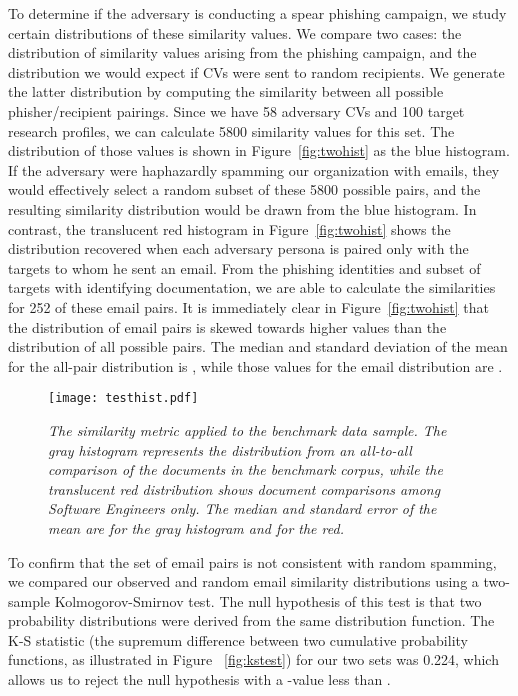 \documentclass[conference]{IEEEtran}
\begin{document}
To determine if the adversary is conducting a spear phishing campaign, we study certain distributions of these similarity values.  We compare two cases: the distribution of similarity values arising from the phishing 
campaign, and the distribution we would expect if CVs were sent to random recipients. We generate the latter distribution by computing the similarity between all possible phisher/recipient pairings. Since we have 58 adversary CVs and 100 target research profiles, we can calculate 5800 similarity values for this set.  The distribution of those values 
is shown in Figure~\ref{fig:twohist} as the blue histogram.  
If the adversary were haphazardly spamming our organization with emails, they would effectively select a random subset of these 5800 possible pairs, and the resulting similarity distribution would be drawn 
from the blue histogram.  In contrast, the translucent red histogram in 
Figure~\ref{fig:twohist} shows the distribution recovered when each adversary persona is paired only with the targets to whom he sent an email.  From 
the phishing identities and subset of targets with identifying documentation, we are able to calculate the similarities for 252 of these email pairs. It is immediately clear in Figure~\ref{fig:twohist} that the 
distribution of email pairs is skewed towards higher values than the distribution of all possible pairs.  The median and standard deviation of the mean for the all-pair distribution is , while those values for the email distribution are .

\begin{figure}[t!]
\begin{center}
\texttt{[image: testhist.pdf]}
\caption{\sl The similarity metric applied to the benchmark data sample.  The gray histogram represents the distribution from an all-to-all comparison of the documents in the 
benchmark corpus, while the translucent red 
distribution shows document comparisons among Software Engineers only.  The median and standard error of the mean are  for the gray histogram and  for the red. \label{fig:benchhist}}
\end{center}
\end{figure}

To confirm that the set of email pairs is not consistent with random spamming, we compared our observed and random email similarity distributions using a two-sample Kolmogorov-Smirnov test.  The null hypothesis of 
this test is that two probability distributions were derived from the same distribution function.  The K-S statistic (the supremum difference between two cumulative probability functions, as illustrated in Figure~
\ref{fig:kstest}) for our two sets was 0.224, which allows us to reject the null hypothesis with a -value less than .
\end{document}

